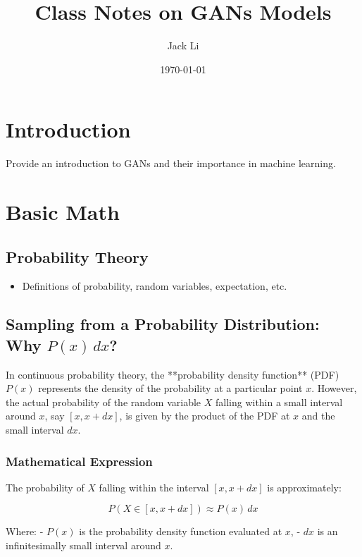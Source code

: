\documentclass{article}
\title{Class Notes on GANs Models}
\author{Jack Li}
\date{\today}
\begin{document}
\maketitle

\tableofcontents

\section{Introduction}
\label{sec:introduction}
Provide an introduction to GANs and their importance in machine learning.

\section{Basic Math}
\label{sec:basic-math}
\subsection{Probability Theory}
\begin{itemize}
    \item Definitions of probability, random variables, expectation, etc.
\end{itemize}



\subsection{Sampling from a Probability Distribution: Why \( P(x) \, dx \)?}

In continuous probability theory, the **probability density function** (PDF) \( P(x) \) represents the density of the probability at a particular point \( x \). However, the actual probability of the random variable \( X \) falling within a small interval around \( x \), say \( [x, x + dx] \), is given by the product of the PDF at \( x \) and the small interval \( dx \).

\subsubsection{Mathematical Expression}

The probability of \( X \) falling within the interval \( [x, x + dx] \) is approximately:

\[
P(X \in [x, x + dx]) \approx P(x) \, dx
\]

Where:
- \( P(x) \) is the probability density function evaluated at \( x \),
- \( dx \) is an infinitesimally small interval around \( x \).
\end{document}
